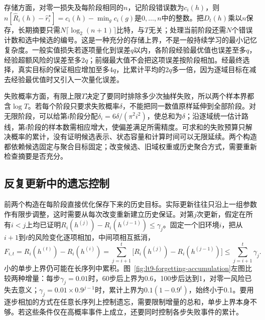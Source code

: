 存储方面，对零一损失及每阶段相同的$n$，记阶段错误数为$c_i(h)$，则$n[\widehat R_i(h)-\widehat r_i^\star]=c_i(h)-\min_gc_i(g)$是$0,\ldots,n$中的整数。把$D_t(h)$乘以$n$保存，长期摘要只需$N\lceil\log_2(n+1)\rceil$比特，与$T$无关；处理当前阶段还需$N$个错误计数和选中候选的编号。这是一种充分的存储上界，不是一般持续学习的最小记忆复杂度。一般实值损失若逐项量化到误差$q$以内，各阶段经验最优值也误差至多$q$，经验超额风险的误差至多$2q$；前缀最大值不会把这项误差按阶段相加。经最终选择，真实目标的保证相应增加至多$4q$，比累计平均的$2q$多一倍，因为逐域目标在减去经验最优值时又引入一次量化误差。

失败概率方面，有限上限$T$决定了要同时排除多少次抽样失败，所以两个样本界都含$\log T$。若每个阶段只要求失败概率$\delta$，不能把同一数值原样延伸到全部阶段。对无限阶段，可以给第$i$阶段分配$\delta_i=6\delta/(\pi^2i^2)$，使总和为$\delta$；沿逐域统一估计路线，第$i$阶段的样本数需相应增大，使偏差满足所需精度。可求和的失败预算只解决概率的累计，没有证明候选表示、状态容量和计算时间可以无限延续。两个构造都依赖候选固定与聚合目标固定；改变候选、旧域权重或历史聚合方式，需要重新检查摘要是否充分。

\subsection{反复更新中的遗忘控制}
\label{sec:continual-repeated-updates}

前两个构造在每阶段直接优化保存下来的历史目标。实际更新往往只沿上一组参数作有限步调整，这时需要从每次改变重新建立历史保证。对第$j$次更新，假定在所有$i<j$上均已证明$R_i(h^{(j)})-R_i(h^{(j-1)})\leq\gamma_j$。固定一个旧环境$i$，把从$i+1$到$t$的风险变化逐项相加，中间项相互抵消，
\[
 F_{i,t}=R_i(h^{(t)})-R_i(h^{(i)})=\sum_{j=i+1}^t\bigl[R_i(h^{(j)})-R_i(h^{(j-1)})\bigr]
       \leq\sum_{j=i+1}^t\gamma_j .
\]
小的单步上界仍可能在长序列中累积。图~\ref{fig:lt9-forgetting-accumulation}左图比较两种增量：每步$\gamma_j=0.01$时，60步后上界为0.6，100步后达到1，对零一风险已失去意义；$\gamma_j=0.01\times0.9^{j-1}$时，累计上界为$0.1(1-0.9^t)$，始终小于0.1。要用逐步相加的方式在任意长序列上控制遗忘，需要限制增量的总和，单步上界本身不够。若这些条件仅在高概率事件上成立，还要同时控制各步失败事件的累计。

